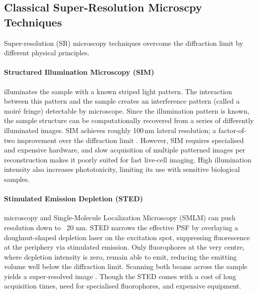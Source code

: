 
\subsection{Classical Super-Resolution Microscpy Techniques}
\label{subsec:sr_techniques}
Super-resolution (SR) microscopy techniques overcome the diffraction limit by different physical 
principles. 
  \paragraph{Structured Illumination Microscopy (SIM)} illuminates
the sample with a known striped light pattern. The interaction between this pattern and the sample
creates an interference pattern (called a moiré fringe) detectable by microscope. Since the illumination
pattern is known, the sample structure can be computationally recovered from a series of differently
illuminated images. SIM achieves roughly 100\,nm lateral resolution; a factor-of-two improvement
over the diffraction limit \cite{gustafsson2000sim, galbraith_2011_superresolution_glance}.
However, SIM requires specialised and expensive hardware, and slow acquisition of multiple patterned images
per reconstruction makes it poorly suited for fast live-cell imaging. High illumination intensity
also increases phototoxicity, limiting its use with sensitive biological samples.

\paragraph{Stimulated Emission Depletion (STED)} microscopy
\cite{sted1994} and Single-Molecule Localization Microscopy (SMLM) can
  push resolution down to ~20 nm. STED narrows the effective PSF by
overlaying a doughnut-shaped depletion laser on the excitation spot,
suppressing fluorescence at the periphery via stimulated emission.
Only fluorophores at the very centre, where depletion intensity is
zero, remain able to emit, reducing the emitting volume well below
the diffraction limit. Scanning both beams across the sample yields a
super-resolved image \cite{huang_2009_super}. Though the STED comes with a cost of
long acquisition times, need for specialised fluorophores, and expensive equipment. 

